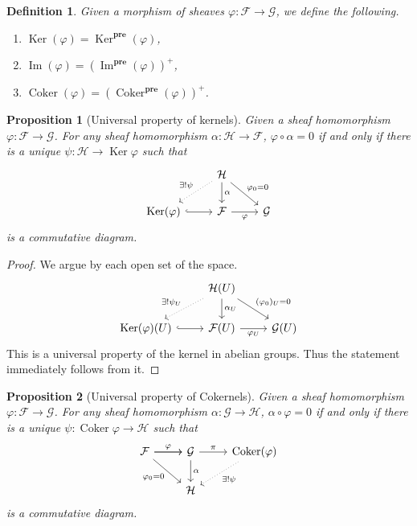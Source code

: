 \documentclass{article}
\newtheorem{proposition}{Proposition}[section]
\newtheorem{definition}{Definition}[section]
\numberwithin{equation}{section}
\DeclareMathOperator{\Ker}{Ker}
\DeclareMathOperator{\Image}{Im}
\DeclareMathOperator{\Coker}{Coker}
\begin{document}
\begin{definition}
Given a morphism of sheaves $\varphi:\mathcal{F}\to\mathcal{G}$, we define the following.
\begin{enumerate}[1).]
\item $\Ker(\varphi)=\Ker^{\mathbf{pre}}(\varphi)$,
\item $\Image(\varphi)=(\Image^{\mathbf{pre}}(\varphi))^+$,
\item $\Coker(\varphi)=(\Coker^{\mathbf{pre}}(\varphi))^+$.
\end{enumerate}
\end{definition}

\begin{proposition}[Universal property of kernels]
Given a sheaf homomorphism $\varphi:\mathcal{F}\to\mathcal{G}$. For any sheaf homomorphism $\alpha:\mathcal{H}\to\mathcal{F}$, $\varphi\circ\alpha = 0$ if and only if there is a unique $\psi:\mathcal{H}\to\Ker\varphi$ such that
\[
\begin{tikzcd}
                                        & \mathcal{H} \arrow[d, "\alpha"] \arrow[rd, "\varphi_0=0"] \arrow[ld, "\exists!\psi"', dotted] &             \\
\Ker(\mathcal{\varphi}) \arrow[r, hook] & \mathcal{F} \arrow[r, "\varphi"']                                                           & \mathcal{G}
\end{tikzcd}
\]
is a commutative diagram.
\end{proposition}
\begin{proof}
We argue by each open set of the space.
\[
\begin{tikzcd}
                                        & \mathcal{H}(U) \arrow[d, "\alpha_U"] \arrow[rd, "(\varphi_0)_U=0"] \arrow[ld, "\exists!\psi_U"', dotted] &             \\
\Ker(\mathcal{\varphi})(U) \arrow[r, hook] & \mathcal{F}(U) \arrow[r, "\varphi_U"']                                                           & \mathcal{G}(U)
\end{tikzcd}
\]
This is a universal property of the kernel in abelian groups. Thus the statement immediately follows from it.
\end{proof}

\begin{proposition}[Universal property of Cokernels]
Given a sheaf homomorphism $\varphi:\mathcal{F}\to\mathcal{G}$. For any sheaf homomorphism $\alpha:\mathcal{G}\to\mathcal{H}$, $\alpha\circ\varphi = 0$ if and only if there is a unique $\psi:\Coker\varphi\to\mathcal{H}$ such that
\[
\begin{tikzcd}
\mathcal{F} \arrow[r, "\varphi"] \arrow[r] \arrow[rd, "\varphi_0=0"'] & \mathcal{G} \arrow[r,"\pi"] \arrow[d, "\alpha"]                 & \Coker(\varphi) \arrow[ld, "\exists!\psi"', dotted, swap]\\
                                                                    & \mathcal{H}  &                
\end{tikzcd}
\]
is a commutative diagram.
\end{proposition}
\end{document}
